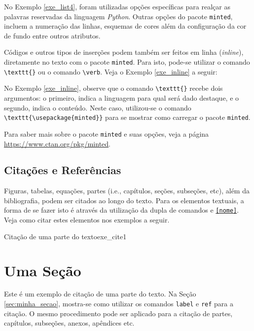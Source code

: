 No Exemplo \ref{exe_list4}, foram utilizadas opções específicas para realçar as palavras reservadas da linguagem \textit{Python}. Outras opções do pacote {\tt minted}, incluem a numeração das linhas, esquemas de cores além da configuração da cor de fundo entre outros atributos.

Códigos e outros tipos de inserções podem também ser feitos em linha (\textit{inline}), diretamente no texto com o pacote {\tt minted}. Para isto, pode-se utilizar o comando \verb|\texttt{}| ou o comando \verb|\verb|. Veja o Exemplo \ref{exe_inline} a seguir:


No Exemplo \ref{exe_inline}, observe que o comando \verb|\texttt{}| recebe dois argumentos: o primeiro, indica a linguagem para qual será dado destaque, e o segundo, indica o conteúdo. Neste caso, utilizou-se o comando \verb|\texttt{\usepackage{minted}}| para se mostrar como carregar o pacote {\tt minted}.

\begin{marker}
Para saber mais sobre o pacote {\tt minted} e suas opções, veja a página \url{https://www.ctan.org/pkg/minted}.
\end{marker}

\subsection{Citações e Referências}
\label{sec:refs}

Figuras, tabelas, equações, partes (i.e., capítulos, seções, subseções, etc), além da bibliografia, podem ser citados ao longo do texto. Para os elementos textuais, a forma de se fazer isto é através da utilização da dupla de comandos \texttt{\label{nome}} e \texttt{\ref{nome}}. Veja como citar estes elementos nos exemplos a seguir.

\begin{texexptitled}[breakable,enhanced,middle=2mm]{Citação de uma parte do texto}{exe_cite1}
\section*{Uma Seção}
\label{sec:minha_secao}

Este é um exemplo de citação de uma parte do texto. Na Seção \ref{sec:minha_secao}, mostra-se como utilizar os comandos {\tt label} e {\tt ref} para a citação. O mesmo procedimento pode ser aplicado para a citação de partes, capítulos, subseções, anexos, apêndices etc.
\end{texexptitled}

